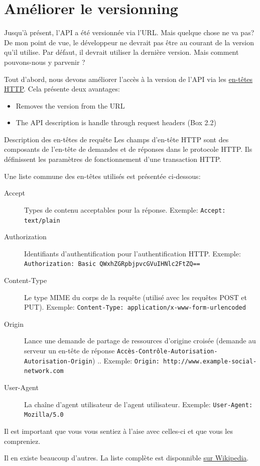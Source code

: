 \documentclass[]{report}
\begin{document}
  \section{Améliorer le versionning}\label{section:improve_api_versioning}

    Jusqu'à présent, l'API a été versionnée via l'URL. Mais quelque chose ne va pas? De mon point de vue, le développeur ne devrait pas être au courant de la version qu'il utilise. Par défaut, il devrait utiliser la dernière version. Mais comment pouvons-nous y parvenir ?

    Tout d'abord, nous devons améliorer l'accès à la version de l'API via les \href{http://en.wikipedia.org/wiki/List_of_HTTP_header_fields}{en-têtes HTTP}. Cela présente deux avantages:

    \begin{itemize}
      \item Removes the version from the URL
      \item The API description is handle through request headers (Box 2.2)
    \end{itemize}


    \begin{tcolorbox}{Description des en-têtes de requête}
      Les champs d'en-tête HTTP sont des composants de l'en-tête de demandes et de réponses dans le protocole HTTP. Ils définissent les paramètres de fonctionnement d'une transaction HTTP.

      Une liste commune des en-têtes utilisés est présentée ci-dessous:

      \begin{description}
        \item[Accept] Types de contenu acceptables pour la réponse. Exemple: \verb|Accept: text/plain|
        \item[Authorization] Identifiants d'authentification pour l'authentification HTTP. Exemple: \verb|Authorization: Basic QWxhZGRpbjpvcGVuIHNlc2FtZQ==|
        \item[Content-Type] Le type MIME du corps de la requête (utilisé avec les requêtes POST et PUT). Exemple: \verb|Content-Type: application/x-www-form-urlencoded|
        \item[Origin] Lance une demande de partage de ressources d'origine croisée (demande au serveur un en-tête de réponse \verb|Accès-Contrôle-Autorisation-Autorisation-Origin|) .. Exemple: \verb|Origin: http://www.example-social-network.com|
        \item[User-Agent] La chaîne d'agent utilisateur de l'agent utilisateur. Exemple: \verb|User-Agent: Mozilla/5.0|
      \end{description}

      Il est important que vous vous sentiez à l'aise avec celles-ci et que vous les compreniez.

      Il en existe beaucoup d'autres. La liste complète est disponnible \href{https://en.wikipedia.org/wiki/List_of_HTTP_header_fields}{sur Wikipedia}.
    \end{tcolorbox}
\end{document}
